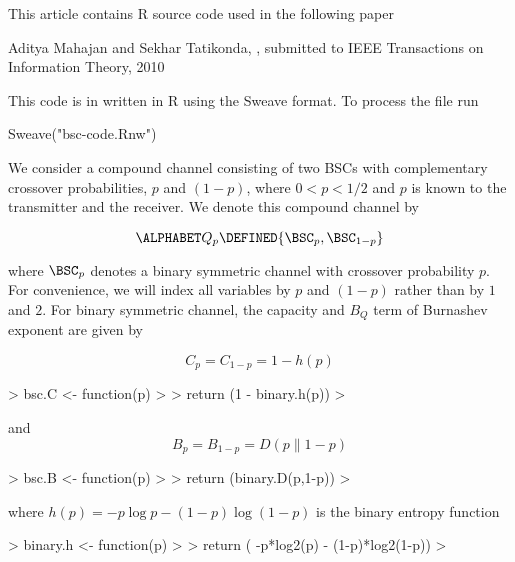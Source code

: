 
This article contains R source code used in the following paper

\startframedtext
  Aditya Mahajan and Sekhar Tatikonda, , 
  submitted to IEEE Transactions on Information Theory, 2010
\stopframedtext

This code is in written in R using the Sweave format. To process the file run

    Sweave("bsc-code.Rnw")




We consider a compound channel consisting of two BSCs with complementary
crossover probabilities, $p$ and $(1-p)$, where $0 < p < 1/2$ and $p$ is known
to the transmitter and the receiver. We denote this compound channel by

$$\ALPHABET Q_p \DEFINED \{\BSC_p, \BSC_{1-p}\} $$

where $\BSC_p$ denotes a binary symmetric channel with crossover probability
$p$. For convenience, we will index all variables by $p$ and $(1-p)$ rather than
by $1$ and $2$. For binary symmetric channel, the capacity and $B_Q$ term of
Burnashev exponent are given by

$$C_p = C_{1-p} = 1 - h(p)$$

\begin{Schunk}
\begin{Sinput}
> bsc.C <- function(p) 
> {
>   return (1 - binary.h(p)) 
> }
\end{Sinput}
\end{Schunk}

and
$$B_p = B_{1-p} = D(p \| 1-p) $$

\begin{Schunk}
\begin{Sinput}
> bsc.B <- function(p) 
> {
>   return (binary.D(p,1-p))
> }
\end{Sinput}
\end{Schunk}
  
where $h(p) = -p \log p - (1-p) \log (1-p)$ is the binary entropy function 

\begin{Schunk}
\begin{Sinput}
> binary.h <- function(p)
> {
>   return ( -p*log2(p) - (1-p)*log2(1-p))
> }
\end{Sinput}
\end{Schunk}

